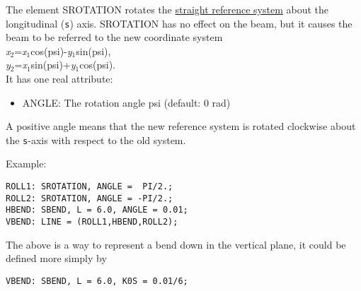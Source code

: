 The element SROTATION rotates the
\href{local_system.html#straight}{straight reference system} about the
longitudinal (\texttt{s}) axis. SROTATION has no effect on the beam, but
it causes the beam to be referred to the new coordinate system \\
\textit{x}$_2$=\textit{x}$_1$cos(psi)-\textit{y}$_1$sin(psi),\\
\textit{y}$_2$=\textit{x}$_1$sin(psi)+\textit{y}$_1$cos(psi).\\ 

It has one real attribute: 
\begin{itemize}
   \item ANGLE: The rotation angle psi (default: 0 rad) 
\end{itemize} 

A positive angle means that the new reference system is rotated
clockwise about the \texttt{s}-axis with respect to the old system.  

Example: 
\begin{verbatim}
ROLL1: SROTATION, ANGLE =  PI/2.;
ROLL2: SROTATION, ANGLE = -PI/2.;
HBEND: SBEND, L = 6.0, ANGLE = 0.01;
VBEND: LINE = (ROLL1,HBEND,ROLL2);
\end{verbatim} 
The above is a way to represent a bend down in the vertical plane, it could be defined more simply by 
\begin{verbatim}
VBEND: SBEND, L = 6.0, K0S = 0.01/6;
\end{verbatim}

